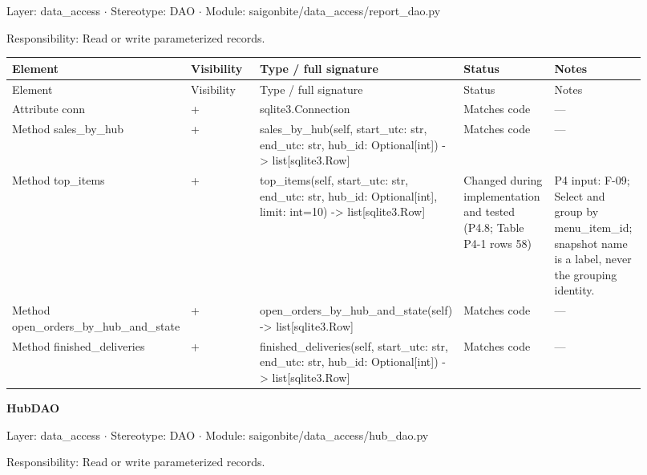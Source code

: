 Layer: data\_access \ensuremath{\cdot} Stereotype: \guillemotleft{}DAO\guillemotright{} \ensuremath{\cdot} Module: saigonbite/data\_access/report\_dao.py

Responsibility: Read or write parameterized records.

\begin{longtable}{>{\raggedright\arraybackslash}p{0.1840\linewidth}>{\raggedright\arraybackslash}p{0.1840\linewidth}>{\raggedright\arraybackslash}p{0.1840\linewidth}>{\raggedright\arraybackslash}p{0.1840\linewidth}>{\raggedright\arraybackslash}p{0.1840\linewidth}}
Element & Visibility & Type / full signature & Status & Notes \\
\hline\endfirsthead
Element & Visibility & Type / full signature & Status & Notes \\
\hline\endhead
Attribute conn & + & sqlite3.Connection & Matches code & --- \\
Method sales\_by\_hub & + & sales\_by\_hub(self, start\_utc: str, end\_utc: str, hub\_id: Optional[int]) -\textgreater{} list[sqlite3.Row] & Matches code & --- \\
Method top\_items & + & top\_items(self, start\_utc: str, end\_utc: str, hub\_id: Optional[int], limit: int=10) -\textgreater{} list[sqlite3.Row] & Changed during implementation and tested (P4.8; Table P4-1 rows 58) & P4 input: F-09; Select and group by menu\_item\_id; snapshot name is a label, never the grouping identity. \\
Method open\_orders\_by\_hub\_and\_state & + & open\_orders\_by\_hub\_and\_state(self) -\textgreater{} list[sqlite3.Row] & Matches code & --- \\
Method finished\_deliveries & + & finished\_deliveries(self, start\_utc: str, end\_utc: str, hub\_id: Optional[int]) -\textgreater{} list[sqlite3.Row] & Matches code & --- \\
\end{longtable}
\textbf{HubDAO}

Layer: data\_access \ensuremath{\cdot} Stereotype: \guillemotleft{}DAO\guillemotright{} \ensuremath{\cdot} Module: saigonbite/data\_access/hub\_dao.py

Responsibility: Read or write parameterized records.

